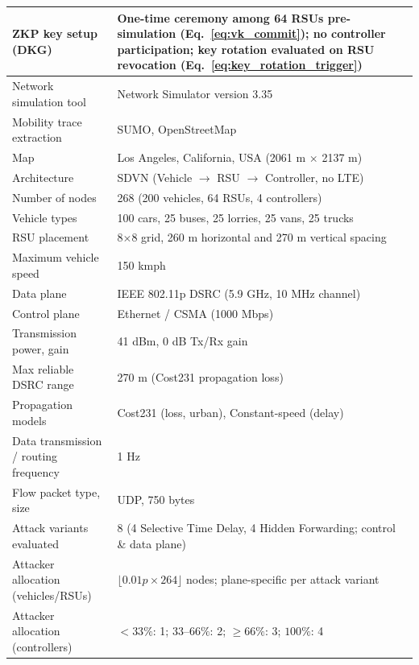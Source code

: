 \documentclass[12pt, a4paper]{report}
\begin{document}
{{\begin{longtable}{|m{5.0cm}|m{9.0cm}|}
\hline
\endlastfoot
            ZKP key setup (DKG) &
One-time ceremony among 64 RSUs pre-simulation
 (Eq.~\ref{eq:vk_commit}); no controller
 participation; key rotation evaluated on
 RSU revocation
 (Eq.~\ref{eq:key_rotation_trigger}) \\
          \hline
            Network simulation tool & Network Simulator version 3.35 \\
            \hline
            Mobility trace extraction & SUMO, OpenStreetMap \\
            \hline
            Map & Los Angeles, California, USA (2061 m $\times$ 2137 m) \\
            \hline
            Architecture & SDVN (Vehicle $\rightarrow$ RSU $\rightarrow$ Controller, no LTE) \\
            \hline
            Number of nodes & 268 (200 vehicles, 64 RSUs, 4 controllers) \\
            \hline
            Vehicle types & 100 cars, 25 buses, 25 lorries, 25 vans, 25 trucks \\
            \hline
            RSU placement & 8$\times$8 grid, 260 m horizontal and 270 m vertical spacing \\
            \hline
            Maximum vehicle speed & 150 kmph \\
            \hline
            Data plane & IEEE 802.11p DSRC (5.9 GHz, 10 MHz channel) \\
            \hline
            Control plane & Ethernet / CSMA (1000 Mbps) \\
            \hline
            Transmission power, gain & 41 dBm, 0 dB Tx/Rx gain \\
            \hline
            Max reliable DSRC range & 270 m (Cost231 propagation loss) \\
            \hline
            Propagation models & Cost231 (loss, urban), Constant-speed (delay) \\
            \hline
            Data transmission / routing frequency & 1 Hz \\
            \hline
            Flow packet type, size & UDP, 750 bytes \\
            \hline
            Attack variants evaluated & 8 (4 Selective Time Delay, 4 Hidden Forwarding; control \& data plane) \\
            \hline
            Attacker allocation (vehicles/RSUs) &
              $\lfloor 0.01p \times 264 \rfloor$ nodes;
              plane-specific per attack variant \\
                \hline
             Attacker allocation (controllers) &
               $<33\%$: 1; $33$--$66\%$: 2;
              $\geq 66\%$: 3; $100\%$: 4 \\
            

\end{longtable}}}
\end{document}
